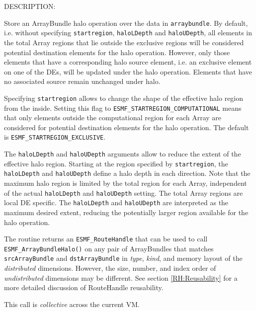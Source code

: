 {\sf DESCRIPTION:\\ }


     \begin{sloppypar}
     Store an ArrayBundle halo operation over the data in {\tt arraybundle}. By 
     default, i.e. without specifying {\tt startregion}, {\tt haloLDepth}
     and {\tt haloUDepth}, all elements in the total Array regions that lie
     outside the exclusive regions will be considered potential destination
     elements for the halo operation. However, only those elements that have a corresponding
     halo source element, i.e. an exclusive element on one of the DEs, will be
     updated under the halo operation. Elements that have no associated source
     remain unchanged under halo.
     \end{sloppypar}
  
     Specifying {\tt startregion} allows to change the shape of the 
     effective halo region from the inside. Setting this flag to
     {\tt ESMF\_STARTREGION\_COMPUTATIONAL} means that only elements outside 
     the computational region for each Array are considered for potential
     destination elements for the halo operation. The default is
     {\tt ESMF\_STARTREGION\_EXCLUSIVE}.
  
     The {\tt haloLDepth} and {\tt haloUDepth} arguments allow to reduce
     the extent of the effective halo region. Starting at the region specified
     by {\tt startregion}, the {\tt haloLDepth} and {\tt haloUDepth}
     define a halo depth in each direction. Note that the maximum halo region is
     limited by the total region for each Array, independent of the actual
     {\tt haloLDepth} and {\tt haloUDepth} setting. The total Array regions are
     local DE specific. The {\tt haloLDepth} and {\tt haloUDepth} are interpreted
     as the maximum desired extent, reducing the potentially larger region
     available for the halo operation.
  
     The routine returns an {\tt ESMF\_RouteHandle} that can be used to call 
     {\tt ESMF\_ArrayBundleHalo()} on any pair of ArrayBundles that matches 
     {\tt srcArrayBundle} and {\tt dstArrayBundle} in {\em type}, {\em kind},
     and memory layout of the {\em distributed} dimensions. However, the size, 
     number, and index order of {\em undistributed} dimensions may be different.
     See section \ref{RH:Reusability} for a more detailed discussion of
     RouteHandle reusability.
    
     This call is {\em collective} across the current VM.  
  
